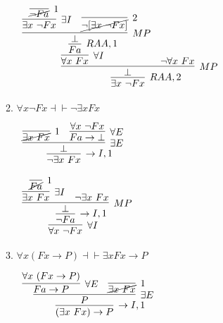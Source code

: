 \documentclass[11pt]{report}
\begin{document}
\begin{enumerate}
\begin{enumerate}
					\begin{mdframed}
						\begin{center}
							$\begin{array}{c}
								\infer[RAA,2]{\exists x \ \lnot Fx}
									{\infer[MP]{\bot}
										{\infer[\forall I]{\forall x \ Fx}
											{\infer[RAA,1]{Fa}
												{\infer[MP]{\bot}
													{\infer[\exists I]{\exists x \ \lnot F x}
														{\infer[1]{\cancel{\lnot Fa}}{}}
													&
													\infer[2]{\cancel{\lnot[\exists x \ \lnot Fx]}}{}}}}
										&
										\lnot \forall x \ Fx}}
							\end{array}$
						\end{center}
					\end{mdframed}

			\newpage
			\item $\forall x \neg Fx \dashv \vdash  \neg \exists x Fx$
			
					\begin{mdframed}
						\begin{center}
							$\begin{array}{c}
								\infer[\to I,1]{\lnot \exists x \ Fx}
									{\infer[\exists E]{\bot}
										{\infer[1]{\cancel{\exists x \ Fx}}{}
										&
										\infer[\forall E]{Fa \to \bot}{\forall x \ \lnot Fx}}}
							\end{array}$
						\end{center}
					\end{mdframed}

					\begin{mdframed}
						\begin{center}
							$\begin{array}{c}
								\infer[\forall I]{\forall x \ \lnot Fx}
									{\infer[\to I,1]{\lnot Fa}
										{\infer[MP]{\bot}
											{\infer[\exists I]{\exists x \ Fx}
												{\infer[1]{\cancel{Fa}}{}}
											&
											\lnot \exists x \ Fx}}}
							\end{array}$
						\end{center}
					\end{mdframed}

			\item $\forall x (Fx \to P) \dashv \vdash  \exists x Fx \to P$
			
					\begin{mdframed}
						\begin{center}
							$\begin{array}{c}
								\infer[\to I,1]{(\exists x \ Fx) \to P}
									{\infer[\exists E]{P}
										{\infer[\forall E]{Fa \to P}
											{\forall x \ (Fx \to P)}
										&
										\infer[1]{\cancel{\exists x \ Fx}}{}}}
							\end{array}$
						\end{center}
					\end{mdframed}


\end{enumerate}
\end{enumerate}
\end{document}
